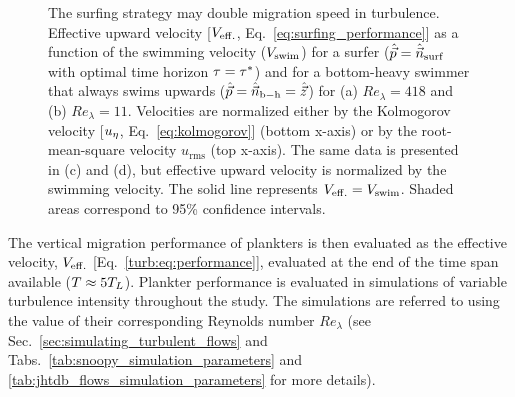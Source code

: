 \begin{figure}[t]
	\centering
	
	\caption[The surfing strategy may double migration speed in turbulence.]{
		The surfing strategy may double migration speed in turbulence.
		Effective upward velocity [$V_{\mathrm{eff.}}$, Eq.~\eqref{eq:surfing_performance}] as a function of the swimming velocity ($V_{\mathrm{swim}}$) for a surfer ($\hat{\vec{p}}=\hat{\vec{n}}_{\mathrm{surf}}$ with optimal time horizon $\tau=\tau^*$) and for a bottom-heavy swimmer that always swims upwards ($\hat{\vec{p}}=\hat{\vec{n}}_{\mathrm{b-h}}=\hat{\vec{z}}$) for (a) $\mathit{Re}_{\lambda} = 418$ and (b) $\mathit{Re}_{\lambda} = 11$.
		Velocities are normalized either by the Kolmogorov velocity [$u_{\eta}$, Eq.~\eqref{eq:kolmogorov}] (bottom x-axis) or by the root-mean-square velocity $u_{\mathrm{rms}}$ (top x-axis).
		The same data is presented in (c) and (d), but effective upward velocity is normalized by the swimming velocity.
		The solid line represents $V_{\mathrm{eff.}} = V_{\mathrm{swim}}$. Shaded areas correspond to 95\% confidence intervals.
	}
	\label{fig:surfing_main_results}
\end{figure}
The vertical migration performance of plankters is then evaluated as the effective velocity, $V_{\mathrm{eff.}}$ [Eq.~\eqref{turb:eq:performance}], evaluated at the end of the time span available ($T \approx 5 T_L$).
Plankter performance is evaluated in simulations of variable turbulence intensity throughout the study.
The simulations are referred to using the value of their corresponding Reynolds number $\mathit{Re}_{\lambda}$ (see Sec.~\ref{sec:simulating_turbulent_flows} and Tabs.~\ref{tab:snoopy_simulation_parameters} and \ref{tab:jhtdb_flows_simulation_parameters} for more details).

